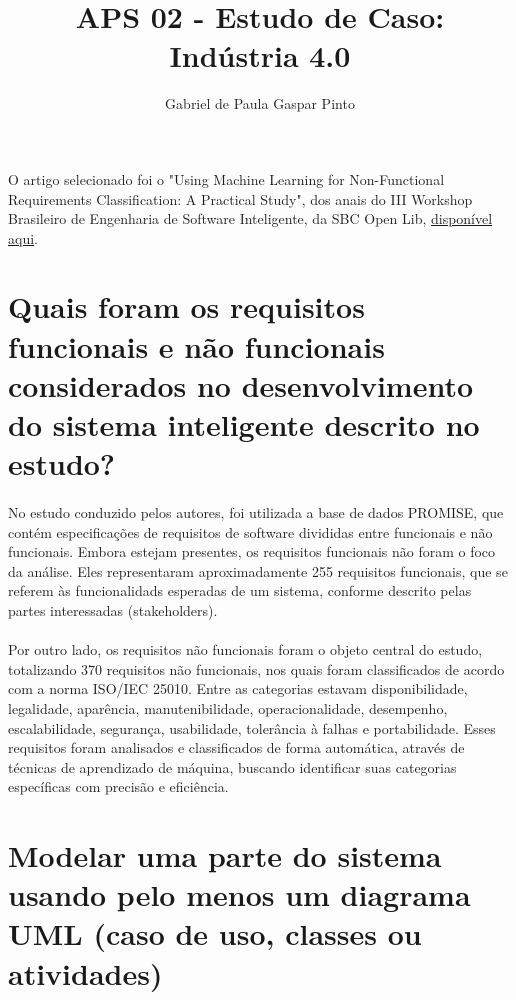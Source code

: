 \documentclass{article}
\title{APS 02 - Estudo de Caso: Indústria 4.0}
\author{Gabriel de Paula Gaspar Pinto}
\date{}
\begin{document}
\maketitle

\paragraph{} O artigo selecionado foi o "Using Machine Learning for Non-Functional Requirements Classification: A Practical Study", dos anais do III Workshop Brasileiro de Engenharia de Software Inteligente, da SBC Open Lib, \href{https://sol.sbc.org.br/index.php/ise/article/view/26121/25944}{disponível aqui}.

\section{Quais foram os requisitos funcionais e não funcionais considerados no desenvolvimento do sistema inteligente descrito no estudo?}

\paragraph{} No estudo conduzido pelos autores, foi utilizada a base de dados PROMISE, que contém especificações de requisitos de software divididas entre funcionais e não funcionais. Embora estejam presentes, os requisitos funcionais não foram o foco da análise. Eles representaram aproximadamente 255 requisitos funcionais, que se referem às funcionalidads esperadas de um sistema, conforme descrito pelas partes interessadas (stakeholders). 
\paragraph{} Por outro lado, os requisitos não funcionais foram o objeto central do estudo, totalizando 370 requisitos não funcionais, nos quais foram classificados de acordo com a norma ISO/IEC 25010. Entre as categorias estavam disponibilidade, legalidade, aparência, manutenibilidade, operacionalidade, desempenho, escalabilidade, segurança, usabilidade, tolerância à falhas e portabilidade. Esses requisitos foram analisados e classificados de forma automática, através de técnicas de aprendizado de máquina, buscando identificar suas categorias específicas com precisão e eficiência.

\section{Modelar uma parte do sistema usando pelo menos um diagrama UML (caso de uso, classes ou atividades)}
\end{document}
